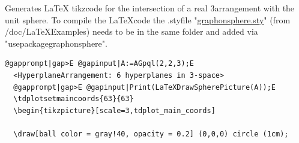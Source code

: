 \documentclass[a4paper,11pt]{report}
\begin{document}
{{{ Generates LaTeX tikz\texttt{}code for the intersection of a real
3\texttt{}arrangement with the unit sphere. To compile the
LaTeX\texttt{}code the .sty\texttt{}file "\href{https://paulmuecksch.github.io/HypArr/doc/LaTeX_Examples/graphonsphere.sty} {graphonsphere.sty}" (from /doc/LaTeX{\textunderscore}Examples) needs to be in the same folder
and added via
"\texttt{}usepackage\texttt{}graphonsphere\texttt{}". 

 
\begin{Verbatim}[commandchars=@|E,fontsize=\small,frame=single,label=Example]
  @gapprompt|gap>E @gapinput|A:=AGpql(2,2,3);E
  <HyperplaneArrangement: 6 hyperplanes in 3-space>
  @gapprompt|gap>E @gapinput|Print(LaTeXDrawSpherePicture(A));E
  \tdplotsetmaincoords{63}{63}
  \begin{tikzpicture}[scale=3,tdplot_main_coords]
  
  \draw[ball color = gray!40, opacity = 0.2] (0,0,0) circle (1cm);
  

\end{Verbatim}}}}
\end{document}
